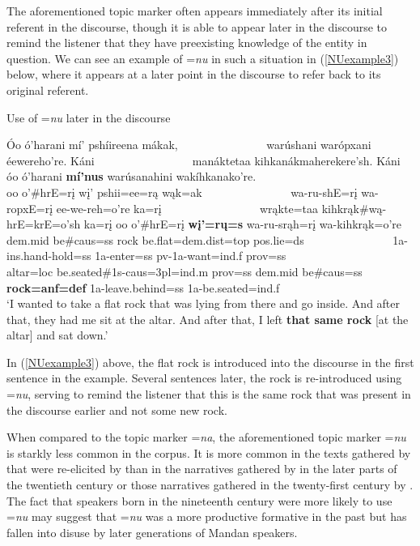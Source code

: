 The aforementioned topic marker often appears immediately after its initial referent in the discourse, though it is able to appear later in the discourse to remind the listener that they have preexisting knowledge of the entity in question. We can see an example of =\textit{nu} in such a situation in (\ref{NUexample3}) below, where it appears at a later point in the discourse to refer back to its original referent.

\newpage

\begin{exe}
    \item\label{NUexample3} Use of =\textit{nu} later in the discourse

    \glll Óo ó'harani mí' pshíireena mákak, ~ ~ ~ ~ ~ ~ ~ ~ ~  warúshani warópxani éewereho're. Káni ~ ~ ~ ~ ~ ~ ~ ~ ~ ~ manáktetaa kihkanákmaherekere'sh. Káni óo ó'harani \textbf{mí'nus} warúsanahini wakíhkanako're.\\ 
    oo o'\#hrE=rį wį' pshii=ee=rą wąk=ak ~ ~ ~ ~ ~ ~ ~ ~ ~ wa-ru-shE=rį wa-ropxE=rį ee-we-reh=o're ka=rį ~ ~ ~ ~ ~ ~ ~ ~ ~ ~ wrąkte=taa kihkrąk\#wą-hrE=krE=o'sh ka=rį oo o'\#hrE=rį \textbf{wį'=rų=s} wa-ru-srąh=rį wa-kihkrąk=o're \\ 
    dem.mid \textnormal{be}\#caus=ss \textnormal{rock} \textnormal{be.flat}=dem.dist=top pos.lie=ds ~ ~ ~ ~ ~ ~ ~ ~ ~ 1a-ins.hand-\textnormal{hold}=ss 1a-\textnormal{enter}=ss pv-1a-\textnormal{want}=ind.f prov=ss ~ ~ ~ ~ ~ ~ ~ ~ ~ ~ \textnormal{altar}=loc \textnormal{be.seated}\#1s-caus=3pl=ind.m prov=ss dem.mid \textnormal{be}\#caus=ss \textbf{\textnormal{\bfseries rock}=anf=def} 1a-\textnormal{leave.behind}=ss 1a-\textnormal{be.seated}=ind.f\\
    \glt `I wanted to take a flat rock that was lying from there and go inside. And after that, they had me sit at the altar. And after that, I left \textbf{that same rock} [at the altar] and sat down.' \citep[318]{hollow1973b}
\end{exe}

In (\ref{NUexample3}) above, the flat rock is introduced into the discourse in the first sentence in the example. Several sentences later, the rock is re-introduced using =\textit{nu}, serving to remind the listener that this is the same rock that was present in the discourse earlier and not some new rock.

When compared to the topic marker =\textit{na}, the aforementioned topic marker =\textit{nu} is starkly less common in the corpus. It is more common in the texts gathered by \citet{kennard1934} that were re-elicited by \citet{hollow1973b} than in the narratives gathered by \citet{hollow1973a} in the later parts of the twentieth century or those narratives gathered in the twenty-first century by \citet{trechter2012b}. The fact that speakers born in the nineteenth century were more likely to use =\textit{nu} may suggest that =\textit{nu} was a more productive formative in the past but has fallen into disuse by later generations of Mandan speakers. 

